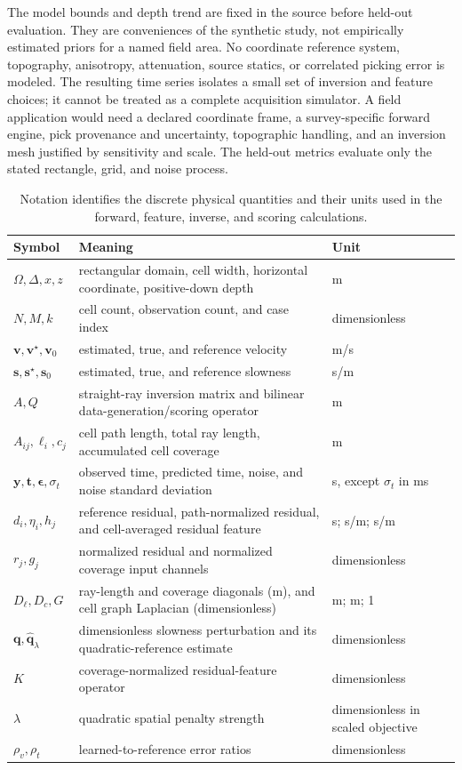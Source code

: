 \documentclass[11pt]{article}
\begin{document}
The model bounds and depth trend are fixed in the source before held-out evaluation. They are conveniences of the synthetic study, not empirically estimated priors for a named field area. No coordinate reference system, topography, anisotropy, attenuation, source statics, or correlated picking error is modeled. The resulting time series isolates a small set of inversion and feature choices; it cannot be treated as a complete acquisition simulator. A field application would need a declared coordinate frame, a survey-specific forward engine, pick provenance and uncertainty, topographic handling, and an inversion mesh justified by sensitivity and scale. The held-out metrics evaluate only the stated rectangle, grid, and noise process.

\begin{table}[htbp]
\centering\small
\caption{Notation identifies the discrete physical quantities and their units used in the forward, feature, inverse, and scoring calculations.}
\label{tab:notation}
\begin{tabular}{p{}p{}p{}}
\toprule Symbol & Meaning & Unit \\
\midrule
$\Omega,\Delta,x,z$ & rectangular domain, cell width, horizontal coordinate, positive-down depth & m \\
$N,M,k$ & cell count, observation count, and case index & dimensionless \\
$\mathbf{v},\mathbf{v}^{\star},\mathbf{v}_0$ & estimated, true, and reference velocity & m/s \\
$\mathbf{s},\mathbf{s}^{\star},\mathbf{s}_0$ & estimated, true, and reference slowness & s/m \\
$A,Q$ & straight-ray inversion matrix and bilinear data-generation/scoring operator & m \\
$A_{ij},\ell_i,c_j$ & cell path length, total ray length, accumulated cell coverage & m \\
$\mathbf{y},\mathbf{t},\boldsymbol{\epsilon},\sigma_t$ & observed time, predicted time, noise, and noise standard deviation & s, except $\sigma_t$ in ms \\
$d_i,\eta_i,h_j$ & reference residual, path-normalized residual, and cell-averaged residual feature & s; s/m; s/m \\
$r_j,g_j$ & normalized residual and normalized coverage input channels & dimensionless \\
$D_{\ell},D_c,G$ & ray-length and coverage diagonals (m), and cell graph Laplacian (dimensionless) & m; m; 1 \\
$\mathbf{q},\widehat{\mathbf{q}}_{\lambda}$ & dimensionless slowness perturbation and its quadratic-reference estimate & dimensionless \\
$K$ & coverage-normalized residual-feature operator & dimensionless \\
$\lambda$ & quadratic spatial penalty strength & dimensionless in scaled objective \\
$\rho_v,\rho_t$ & learned-to-reference error ratios & dimensionless \\
\bottomrule
\end{tabular}
\end{table}
\end{document}
